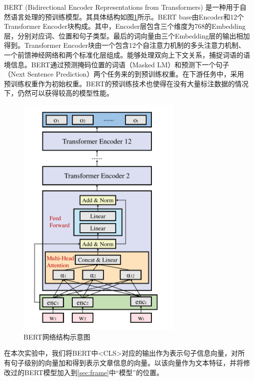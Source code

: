 \documentclass[lang=cn,a4paper]{elegantpaper}
\begin{document}
BERT (Bidirectional Encoder Representations from Transformers) 是一种用于自然语言处理的预训练模型\citep{devlin2018bert}。其具体结构如图\ref{fig:BERT}所示。BERT base由Encoder和12个Transformer Encoder块构成。其中，Encoder层包含三个维度为768的Embedding层，分别对应词、位置和句子类型。最后的词向量由三个Embedding层的输出相加得到。Transformer Encoder块由一个包含12个自注意力机制的多头注意力机制、一个前馈神经网络和两个标准化层组成。能够处理双向上下文关系，捕捉词语的语境信息。BERT通过预测掩码位置的词语（Masked LM）和预测下一个句子（Next Sentence Prediction）两个任务来的到预训练权重。在下游任务中，采用预训练权重作为初始权重。BERT的预训练技术也使得在没有大量标注数据的情况下，仍然可以获得较高的模型性能。
\begin{figure}[!htbp]
  \centering
  \includegraphics[width=3.2in]{image/BERT.pdf}
  \caption{BERT网络结构示意图}
  \label{fig:BERT}
\end{figure}


在本次实验中，我们将BERT中<CLS>对应的输出作为表示句子信息向量，对所有句子级别的向量加和得到表示文章信息的向量。以该向量作为文本特征，并将修改过的BERT模型加入到\ref{sec:frame}中“模型”的位置。
\end{document}
